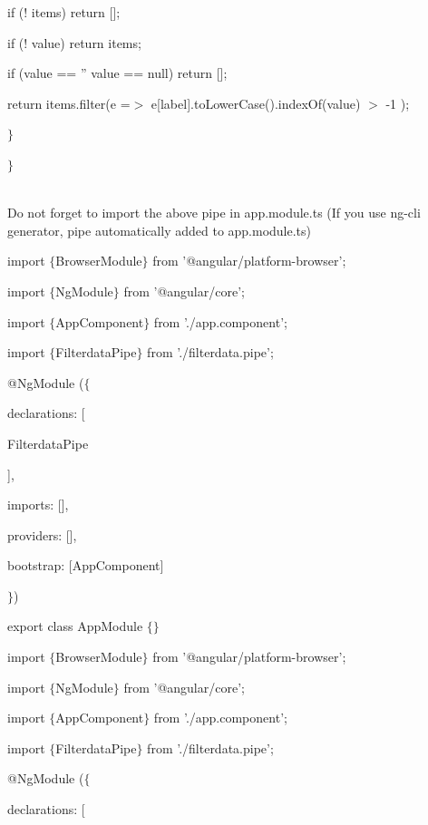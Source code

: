 \documentclass{article}
\begin{document}
if (! items) return [];

if (! value) return items;

if (value == '' {\textbar}{\textbar} value == null) return [];

return items.filter(e =$\mathrm{>}$ e[label].toLowerCase().indexOf(value) $\mathrm{>}$ -1 );

$\mathrm{\}}$

\noindent $\mathrm{\}}$

\noindent 

\noindent \\ Do not forget to import the above pipe in app.module.ts (If you use ng-cli generator, pipe automatically added to app.module.ts) \\

\noindent 

\noindent import $\mathrm{\{}$BrowserModule$\mathrm{\}}$ from '@angular/platform-browser'; 

\noindent import $\mathrm{\{}$NgModule$\mathrm{\}}$ from '@angular/core';

\noindent import $\mathrm{\{}$AppComponent$\mathrm{\}}$ from './app.component';

\noindent import $\mathrm{\{}$FilterdataPipe$\mathrm{\}}$ from './filterdata.pipe';      

\noindent @NgModule ($\mathrm{\{}$      

declarations: [      

  FilterdataPipe      

 ],      

 imports: [],      

 providers: [],      

 bootstrap: [AppComponent]      

\noindent $\mathrm{\}}$)      

\noindent export class AppModule $\mathrm{\{}$$\mathrm{\}}$       

\noindent import $\mathrm{\{}$BrowserModule$\mathrm{\}}$ from '@angular/platform-browser';    

\noindent import $\mathrm{\{}$NgModule$\mathrm{\}}$ from '@angular/core';      

\noindent import $\mathrm{\{}$AppComponent$\mathrm{\}}$ from './app.component';      

\noindent import $\mathrm{\{}$FilterdataPipe$\mathrm{\}}$ from './filterdata.pipe';      

\noindent @NgModule ($\mathrm{\{}$      

 declarations: [      
\end{document}

